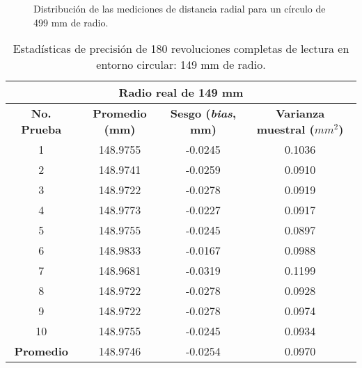 \begin{figure}[H]
	\centering
	\caption{Distribución de las mediciones de distancia radial para un círculo de 499 mm de radio.}
	\label{fig:histograma_dists8}
\end{figure}

\begin{table}[!ht]
	\centering
	\begin{tabular}{|c|c|c|c|}
		\hline
		\multicolumn{4}{|c|}{\textbf{Radio real de 149 mm}} \\ \hline
		\textbf{No. Prueba} & \textbf{Promedio (mm)} & \textbf{Sesgo (\textit{bias}, mm)} & \textbf{Varianza muestral ($mm^2$)} \\ \hline
		1 & 148.9755 & -0.0245 & 0.1036 \\ 
		2 & 148.9741 & -0.0259 & 0.0910 \\ 
		3 & 148.9722 & -0.0278 & 0.0919 \\ 
		4 & 148.9773 & -0.0227 & 0.0917 \\ 
		5 & 148.9755 & -0.0245 & 0.0897 \\ 
		6 & 148.9833 & -0.0167 & 0.0988 \\ 
		7 & 148.9681 & -0.0319 & 0.1199 \\ 
		8 & 148.9722 & -0.0278 & 0.0928 \\ 
		9 & 148.9722 & -0.0278 & 0.0974 \\
		10 & 148.9755 & -0.0245 & 0.0934 \\ \hline
		\textbf{Promedio} & 148.9746 & -0.0254 & 0.0970 \\ \hline
	\end{tabular}
	\caption{Estadísticas de precisión de 180 revoluciones completas de lectura en entorno circular: 149 mm de radio.}
	\label{fig:tabla_dists1}
\end{table}

